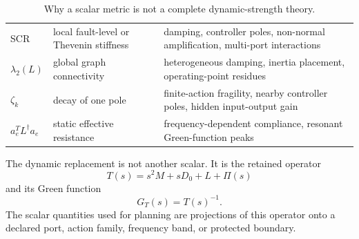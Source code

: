 \begin{table}[ht]
\centering
\caption{Why a scalar metric is not a complete dynamic-strength theory.}
\label{tab:framework_scalar_limits}
\begin{tabular}{L{0.20\textwidth}L{0.28\textwidth}L{0.34\textwidth}}
\toprule
{}
 &  & \\
\midrule
SCR & local fault-level or Thevenin stiffness & damping, controller poles,
non-normal amplification, multi-port interactions\\
\(\lambda_2(L)\) & global graph connectivity & heterogeneous damping,
inertia placement, operating-point residues\\
\(\zeta_k\) & decay of one pole & finite-action fragility, nearby controller
poles, hidden input-output gain\\
\(a_e^TL^\dagger a_e\) & static effective resistance & frequency-dependent
compliance, resonant Green-function peaks\\
\bottomrule
\end{tabular}
\end{table}

The dynamic replacement is not another scalar. It is the retained operator
\begin{equation}
  T(s)=s^2M+sD_0+L+\Pi(s)
  \label{eq:framework_core_operator}
\end{equation}
and its Green function
\begin{equation}
  G_T(s)=T(s)^{-1}.
  \label{eq:framework_green}
\end{equation}
The scalar quantities used for planning are projections of this operator onto a
declared port, action family, frequency band, or protected boundary.

